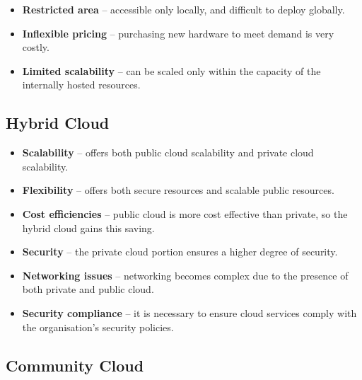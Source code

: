 \documentclass[11pt,a4paper]{article}
\begin{document}

\begin{itemize}\itemsep2pt
  \item \textbf{Restricted area} -- accessible only locally, and difficult to deploy globally.
  \item \textbf{Inflexible pricing} -- purchasing new hardware to meet demand is very costly.
  \item \textbf{Limited scalability} -- can be scaled only within the capacity of the
        internally hosted resources.
\end{itemize}

\subsection{Hybrid Cloud}



\begin{itemize}\itemsep2pt
  \item \textbf{Scalability} -- offers both public cloud scalability and private cloud
        scalability.
  \item \textbf{Flexibility} -- offers both secure resources and scalable public resources.
  \item \textbf{Cost efficiencies} -- public cloud is more cost effective than private, so the
        hybrid cloud gains this saving.
  \item \textbf{Security} -- the private cloud portion ensures a higher degree of security.
\end{itemize}


\begin{itemize}\itemsep2pt
  \item \textbf{Networking issues} -- networking becomes complex due to the presence of both
        private and public cloud.
  \item \textbf{Security compliance} -- it is necessary to ensure cloud services comply with
        the organisation's security policies.
\end{itemize}

\subsection{Community Cloud}
\end{document}
